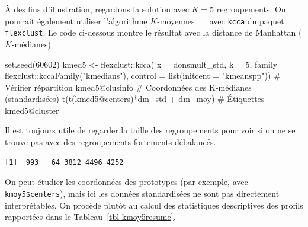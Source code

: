 \documentclass[
  11pt,
  letterpaper,
]{scrbook}
\newenvironment{Shaded}{\begin{snugshade}}{\end{snugshade}}
\newcommand{\AttributeTok}[1]{\textcolor[rgb]{0.40,0.45,0.13}{#1}}
\newcommand{\CommentTok}[1]{\textcolor[rgb]{0.37,0.37,0.37}{#1}}
\newcommand{\DecValTok}[1]{\textcolor[rgb]{0.68,0.00,0.00}{#1}}
\newcommand{\FunctionTok}[1]{\textcolor[rgb]{0.28,0.35,0.67}{#1}}
\newcommand{\NormalTok}[1]{\textcolor[rgb]{0.00,0.23,0.31}{#1}}
\newcommand{\OtherTok}[1]{\textcolor[rgb]{0.00,0.23,0.31}{#1}}
\newcommand{\SpecialCharTok}[1]{\textcolor[rgb]{0.37,0.37,0.37}{#1}}
\newcommand{\StringTok}[1]{\textcolor[rgb]{0.13,0.47,0.30}{#1}}
\theoremstyle{definition}
\theoremstyle{remark}
\begin{document}
À des fins d'illustration, regardons la solution avec \(K=5\)
regroupements. On pourrait également utiliser l'algorithme
\(K\)-moyennes\({}^{++}\) avec \texttt{kcca} du paquet
\texttt{flexclust}. Le code ci-dessous montre le résultat avec la
distance de Manhattan (\(K\)-médianes)

\begin{Shaded}
\begin{Highlighting}[]
\FunctionTok{set.seed}\NormalTok{(}\DecValTok{60602}\NormalTok{)}
\NormalTok{kmed5 }\OtherTok{\textless{}{-}}\NormalTok{ flexclust}\SpecialCharTok{::}\FunctionTok{kcca}\NormalTok{(}
  \AttributeTok{x =}\NormalTok{ donsmult\_std,}
  \AttributeTok{k =} \DecValTok{5}\NormalTok{,}
  \AttributeTok{family =}\NormalTok{ flexclust}\SpecialCharTok{::}\FunctionTok{kccaFamily}\NormalTok{(}\StringTok{"kmedians"}\NormalTok{),}
  \AttributeTok{control =} \FunctionTok{list}\NormalTok{(}\AttributeTok{initcent =} \StringTok{"kmeanspp"}\NormalTok{))}
\CommentTok{\# Vérifier répartition}
\NormalTok{kmed5}\SpecialCharTok{@}\NormalTok{clusinfo}
\CommentTok{\# Coordonnées des K{-}médianes (standardisées)}
\FunctionTok{t}\NormalTok{(}\FunctionTok{t}\NormalTok{(kmed5}\SpecialCharTok{@}\NormalTok{centers)}\SpecialCharTok{*}\NormalTok{dm\_std }\SpecialCharTok{+}\NormalTok{ dm\_moy)}
\CommentTok{\# Étiquettes}
\NormalTok{kmed5}\SpecialCharTok{@}\NormalTok{cluster}
\end{Highlighting}
\end{Shaded}

Il est toujours utile de regarder la taille des regroupements pour voir
si on ne se trouve pas avec des regroupements fortements débalancés.

\begin{Shaded}
\end{Shaded}

\begin{verbatim}
[1]  993   64 3812 4496 4252
\end{verbatim}

On peut étudier les coordonnées des prototypes (par exemple, avec
\texttt{kmoy5\$centers}), mais ici les données standardisées ne sont pas
directement interprétables. On procède plutôt au calcul des statistiques
descriptives des profils rapportées dans le
Tableau~\ref{tbl-kmoy5resume}.
\end{document}
